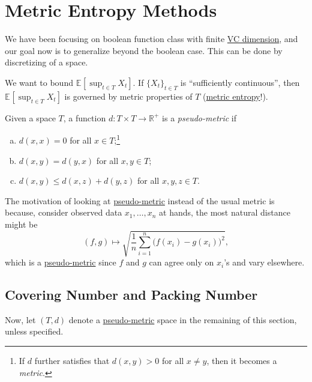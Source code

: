 \section{Metric Entropy Methods}
We have been focusing on boolean function class with finite \hyperref[def:VC-dimension]{VC dimension}, and our goal now is to generalize beyond the boolean case. This can be done by discretizing of a space.

\begin{intuition}\label{int:informal-principle}
	We want to bound \(\mathbb{E}_{}\left[\sup _{t\in T } X_t \right]\). If \(\{ X_t \} _{t\in T}\) is ``sufficiently continuous'', then \(\mathbb{E}_{}\left[\sup _{t\in T} X_t\right] \) is governed by metric properties of \(T\) (\hyperref[def:metric-entropy]{metric entropy}!).
\end{intuition}

\begin{definition}\label{def:pseudo-metric}
	Given a space \(T\), a function \(d\colon T \times T \to \mathbb{R} ^+\) is a \emph{pseudo-metric} if
	\begin{enumerate}[(a)]
		\item \(d(x, x) = 0\) for all \(x \in T\);\footnote{If \(d\) further satisfies that \(d(x, y) > 0\) for all \(x \neq y\), then it becomes a \emph{metric}.}
		\item \(d(x, y) = d(y, x)\) for all \(x, y\in T\);
		\item \(d(x, y) \leq d(x, z) + d(y, z)\) for all \(x, y, z\in T\).
	\end{enumerate}
\end{definition}

\begin{note}
	The motivation of looking at \hyperref[def:pseudo-metric]{pseudo-metric} instead of the usual metric is because, consider observed data \(x_1, \dots , x_n\) at hands, the most natural distance might be
	\[
		(f, g) \mapsto \sqrt{\frac{1}{n} \sum_{i=1}^{n} \big(f(x_i) - g(x_i)\big)^2},
	\]
	which is a \hyperref[def:pseudo-metric]{pseudo-metric} since \(f\) and \(g\) can agree only on \(x_i\)'s and vary elsewhere.
\end{note}

\subsection{Covering Number and Packing Number}
Now, let \((T, d)\) denote a \hyperref[def:pseudo-metric]{pseudo-metric} space in the remaining of this section, unless specified.

